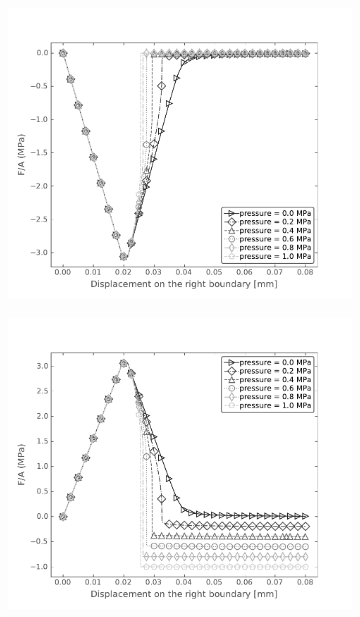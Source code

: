 \begin{figure}[htb!]
  \centering
  \begin{subfigure}[t]{0.49\linewidth}
    \centering
    \includegraphics[width=\linewidth]{Chapter3/figures/bar_pressure_left}
    \caption{}
    \label{fig:bar_pressure}
  \end{subfigure}
  \begin{subfigure}[t]{0.49\linewidth}
    \centering
    \includegraphics[width=\linewidth]{Chapter3/figures/bar_pressure_right}
    \caption{}

\end{subfigure}
\end{figure}
